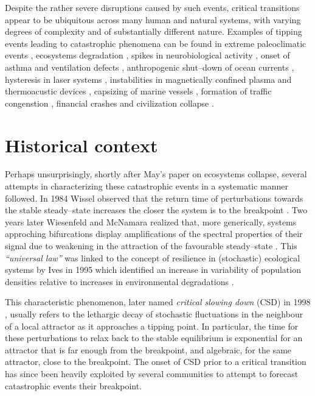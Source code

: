 Despite the rather severe disruptions caused by such events, critical transitions appear to be ubiquitous across many human and natural systems, with varying degrees of complexity and of substantially different nature.
Examples of tipping events leading to catastrophic phenomena can be found in extreme paleoclimatic events \cite{Lenton2012,Bagniewski2023}, ecosystems degradation \cite{OSullivan2023,Kumar2026}, spikes in neurobiological activity \cite{Boerner2024}, onset of asthma and ventilation defects \cite{Venegas2005,Donovan2015}, anthropogenic shut--down of ocean currents \cite{Boers2021,Dijkstra2026}, hysteresis in laser systems \cite{Hohl1995}, instabilities in magnetically confined plasma \cite{Cowley2015} and thermoacustic devices \cite{Pavithran2021}, capsizing of marine vessels \cite{Shao2026}, formation of traffic congenstion \cite{Chattopadhyay2026}, financial crashes \cite{Vandewalle1998,Kozlowska2016} and civilization collapse \cite{Scheffer2021,Doak2026}.

\section{Historical context}
Perhaps unsurprisingly, shortly after May's paper on ecosystems collapse, several attempts in characterizing these catastrophic events in a systematic manner followed.
In 1984 Wissel observed that the return time of perturbations towards the stable steady--state increases the closer the system is to the breakpoint \cite{Wissel1984}.
Two years later Wiesenfeld and McNamara realized that, more generically, systems approching bifurcations display amplifications of the spectral properties of their signal due to weakening in the attraction of the favourable steady--state \cite{Wiesenfeld1986}.
This \emph{``universal law''} was linked to the concept of resilience in (stochastic) ecological systems by Ives in 1995 which identified an increase in variability of population densities relative to increases in environmental degradations \cite{Ives1995}.

This characteristic phenomenon, later named \emph{critical slowing down} (CSD) in 1998 \cite{Gandhi1998}, usually refers to the lethargic decay of stochastic fluctuations in the neighbour of a local attractor as it approaches a tipping point.
In particular, the time for these perturbations to relax back to the stable equilibrium is exponential for an attractor that is far enough from the breakpoint, and algebraic, for the same attractor, close to the breakpoint.
The onset of CSD prior to a critical transition has since been heavily exploited by several communities to attempt to forecast catastrophic events their breakpoint.

